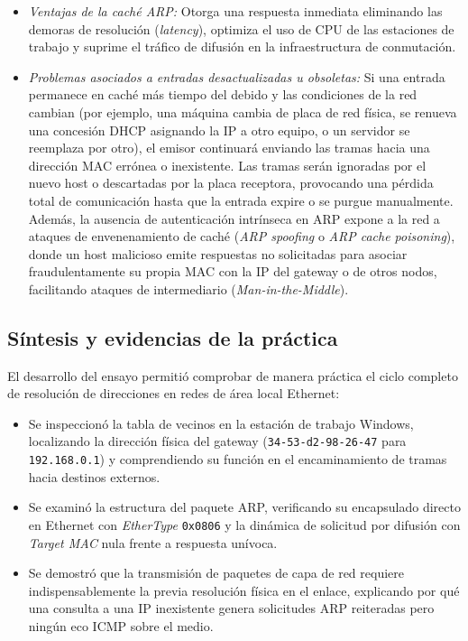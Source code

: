 \documentclass[12pt,a4paper]{article}
\begin{document}
\begin{itemize}
    \item \emph{Ventajas de la caché ARP:} Otorga una respuesta inmediata eliminando las demoras de resolución (\emph{latency}), optimiza el uso de CPU de las estaciones de trabajo y suprime el tráfico de difusión en la infraestructura de conmutación.
    \item \emph{Problemas asociados a entradas desactualizadas u obsoletas:} Si una entrada permanece en caché más tiempo del debido y las condiciones de la red cambian (por ejemplo, una máquina cambia de placa de red física, se renueva una concesión DHCP asignando la IP a otro equipo, o un servidor se reemplaza por otro), el emisor continuará enviando las tramas hacia una dirección MAC errónea o inexistente. Las tramas serán ignoradas por el nuevo host o descartadas por la placa receptora, provocando una pérdida total de comunicación hasta que la entrada expire o se purgue manualmente. Además, la ausencia de autenticación intrínseca en ARP expone a la red a ataques de envenenamiento de caché (\emph{ARP spoofing} o \emph{ARP cache poisoning}), donde un host malicioso emite respuestas no solicitadas para asociar fraudulentamente su propia MAC con la IP del gateway o de otros nodos, facilitando ataques de intermediario (\emph{Man-in-the-Middle}).
\end{itemize}

\subsection{Síntesis y evidencias de la práctica}

El desarrollo del ensayo permitió comprobar de manera práctica el ciclo completo de resolución de direcciones en redes de área local Ethernet:
\begin{itemize}
    \item Se inspeccionó la tabla de vecinos en la estación de trabajo Windows, localizando la dirección física del gateway (\texttt{34-53-d2-98-26-47} para \texttt{192.168.0.1}) y comprendiendo su función en el encaminamiento de tramas hacia destinos externos.
    \item Se examinó la estructura del paquete ARP, verificando su encapsulado directo en Ethernet con \emph{EtherType} \texttt{0x0806} y la dinámica de solicitud por difusión con \emph{Target MAC} nula frente a respuesta unívoca.
    \item Se demostró que la transmisión de paquetes de capa de red requiere indispensablemente la previa resolución física en el enlace, explicando por qué una consulta a una IP inexistente genera solicitudes ARP reiteradas pero ningún eco ICMP sobre el medio.
\end{itemize}
\end{document}
